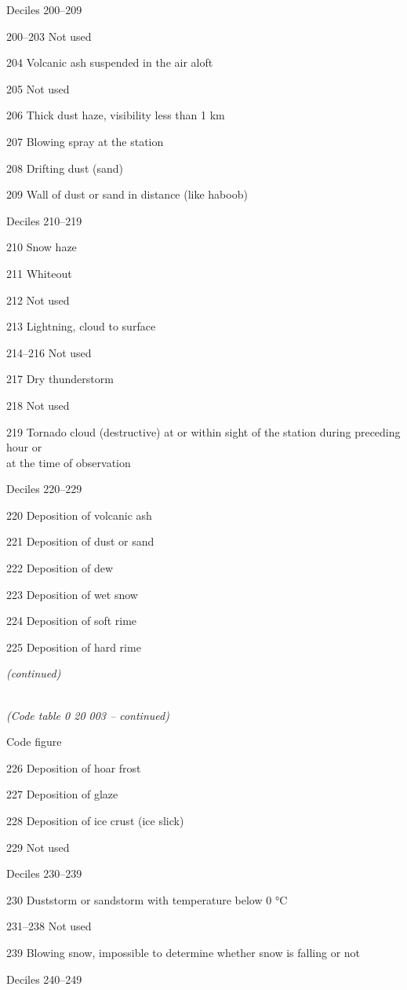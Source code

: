 Deciles 200--209

200--203 Not used

204 Volcanic ash suspended in the air aloft

205 Not used

206 Thick dust haze, visibility less than 1 km

207 Blowing spray at the station

208 Drifting dust (sand)

209 Wall of dust or sand in distance (like haboob)

Deciles 210--219

210 Snow haze

211 Whiteout

212 Not used

213 Lightning, cloud to surface

214--216 Not used

217 Dry thunderstorm

218 Not used

219 Tornado cloud (destructive) at or within sight of the station during preceding hour or\\
at the time of observation

Deciles 220--229

220 Deposition of volcanic ash

221 Deposition of dust or sand

222 Deposition of dew

223 Deposition of wet snow

224 Deposition of soft rime

225 Deposition of hard rime

\emph{(continued)}

\emph{\\
(Code table 0 20 003 -- continued)}

Code figure

226 Deposition of hoar frost

227 Deposition of glaze

228 Deposition of ice crust (ice slick)

229 Not used

Deciles 230--239

230 Duststorm or sandstorm with temperature below 0 °C

231--238 Not used

239 Blowing snow, impossible to determine whether snow is falling or not

Deciles 240--249


